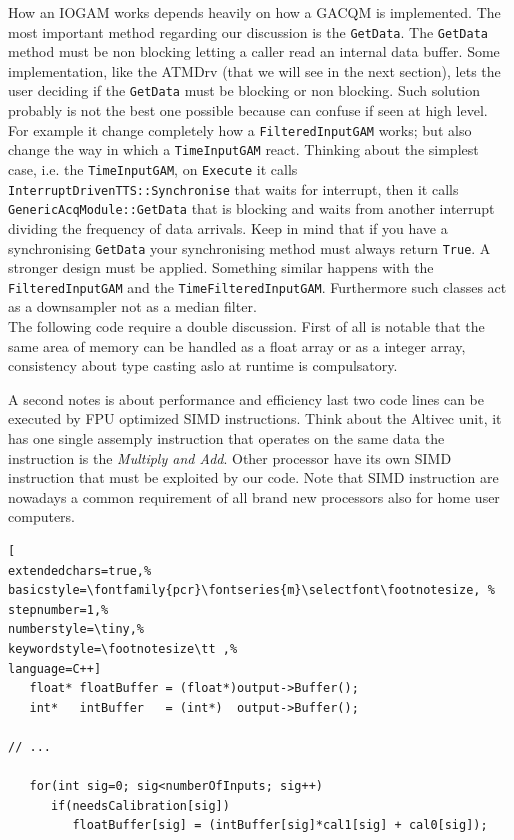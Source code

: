 How an IOGAM works depends heavily on how a GACQM is implemented. The most important method regarding our discussion is the \texttt{GetData}. The \texttt{GetData} method must be non blocking letting a caller read an internal data buffer. Some implementation, like the ATMDrv (that we will see in the next section), lets the user deciding if the \texttt{GetData} must be blocking or non blocking. Such solution probably is not the best one possible because can confuse if seen at high level.
For example it change completely how a \texttt{FilteredInputGAM} works; but also change the way in which a \texttt{TimeInputGAM} react. Thinking about the simplest case, i.e. the \texttt{TimeInputGAM}, on \texttt{Execute} it calls \texttt{InterruptDrivenTTS::Synchronise} that waits for interrupt, then it calls \texttt{GenericAcqModule::GetData} that is blocking and waits from another interrupt dividing the frequency of data arrivals. Keep in mind that if you have a synchronising \texttt{GetData} your synchronising method must always return \texttt{True}. A stronger design must be applied. Something similar happens with the \texttt{FilteredInputGAM} and the \texttt{TimeFilteredInputGAM}. Furthermore such classes act as a downsampler not as a median filter. \\


The following code require a double discussion. First of all is notable that the same area of memory can be handled as a float array or as a integer array, consistency about type casting aslo at runtime is compulsatory.

A second notes is about performance and efficiency last two code lines can be executed by FPU optimized SIMD instructions. Think about the Altivec unit, it has one single assemply instruction that operates on the same data the instruction is the \textit{Multiply and Add}. Other processor have its own SIMD instruction that must be exploited by our code. Note that SIMD instruction are nowadays a common requirement of all brand new processors also for home user computers. \\

\begin{lstlisting}[
extendedchars=true,%
basicstyle=\fontfamily{pcr}\fontseries{m}\selectfont\footnotesize, %
stepnumber=1,%
numberstyle=\tiny,%
keywordstyle=\footnotesize\tt ,%
language=C++]
   float* floatBuffer = (float*)output->Buffer();
   int*   intBuffer   = (int*)  output->Buffer();

// ...

   for(int sig=0; sig<numberOfInputs; sig++)
      if(needsCalibration[sig])
         floatBuffer[sig] = (intBuffer[sig]*cal1[sig] + cal0[sig]);
\end{lstlisting}



